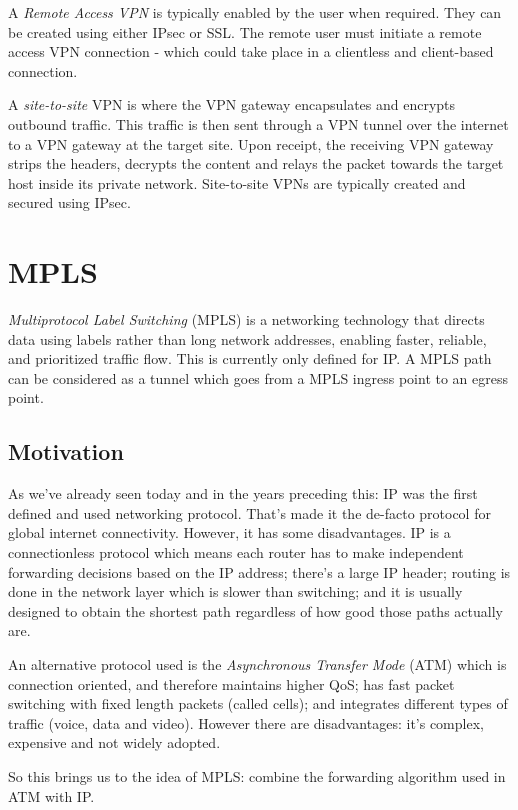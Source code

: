 A \textit{Remote Access VPN} is typically enabled by the user when required. They can be created using either IPsec or SSL. The remote user must initiate a remote access VPN connection - which could take place in a clientless and client-based connection. 

A \textit{site-to-site} VPN is where the VPN gateway encapsulates and encrypts outbound traffic. This traffic is then sent through a VPN tunnel over the internet to a VPN gateway at the target site. Upon receipt, the receiving VPN gateway strips the headers, decrypts the content and relays the packet towards the target host inside its private network. Site-to-site VPNs are typically created and secured using IPsec. 

\section{MPLS}
\textit{Multiprotocol Label Switching} (MPLS) is a networking technology that directs data using labels rather than long network addresses, enabling faster, reliable, and prioritized traffic flow. This is currently only defined for IP. A MPLS path can be considered as a tunnel which goes from a MPLS ingress point to an egress point.

\subsection{Motivation}
As we've already seen today and in the years preceding this: IP was the first defined and used networking protocol. That's made it the de-facto protocol for global internet connectivity. However, it has some disadvantages. IP is a connectionless protocol which means each router has to make independent forwarding decisions based on the IP address; there's a large IP header; routing is done in the network layer which is slower than switching; and it is usually designed to obtain the shortest path regardless of how good those paths actually are.

An alternative protocol used is the \textit{Asynchronous Transfer Mode} (ATM) which is connection oriented, and therefore maintains higher QoS; has fast packet switching with fixed length packets (called cells); and integrates different types of traffic (voice, data and video). However there are disadvantages: it's complex, expensive and not widely adopted.

So this brings us to the idea of MPLS: combine the forwarding algorithm used in ATM with IP.

